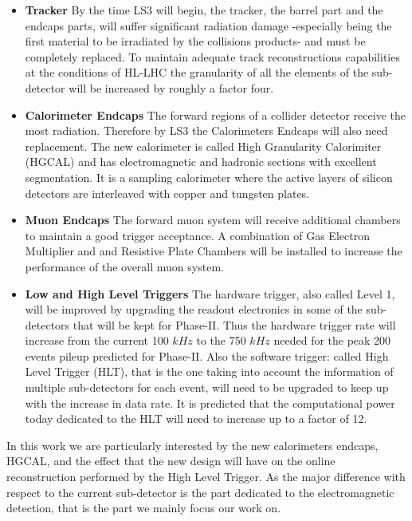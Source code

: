 \begin{itemize}
\item \textbf{Tracker} By the time LS3 will begin, the tracker, the barrel part and the endcaps parts, will suffer significant radiation damage -especially being the first material to be irradiated by the collisions products- and must be completely replaced. To maintain adequate track reconstructions capabilities at the conditions of HL-LHC the granularity of all the elements of the sub-detector will be increased by roughly a factor four.
\item \textbf{Calorimeter Endcaps} The forward regions of a collider detector receive the most radiation. Therefore by LS3 the Calorimeters Endcaps will also need replacement. The new calorimeter is called High Granularity Calorimiter (HGCAL) and has electromagnetic and hadronic sections with excellent segmentation. It is a sampling calorimeter where the active layers of silicon detectors are interleaved with copper and tungsten plates.
\item \textbf{Muon Endcaps} The forward muon system will receive additional chambers to maintain a good trigger acceptance. A combination of Gas Electron Multiplier and and Resistive Plate Chambers will be installed to increase the performance of the overall muon system.
\item \textbf{Low and High Level Triggers} The hardware trigger, also called Level 1, will be improved by upgrading the readout electronics in some of the sub-detectors that will be kept for Phase-II. Thus the hardware trigger rate will increase from the current 100 $\unit{kHz}$ to the 750 $\unit{kHz}$ needed for the peak 200 events pileup predicted for Phase-II. Also the software trigger: called High Level Trigger (HLT), that is the one taking into account the information of multiple sub-detectors for each event, will need to be upgraded to keep up with the increase in data rate. It is predicted that the computational power today dedicated to the HLT will need to increase up to a factor of 12.
\end{itemize}

In this work we are particularly interested by the new calorimeters endcaps, HGCAL, and the effect that the new design will have on the online reconstruction performed by the High Level Trigger. As the major difference with respect to the current sub-detector is the part dedicated to the electromagnetic detection, that is the part we mainly focus our work on.

